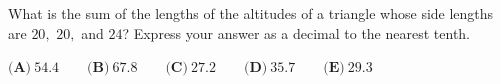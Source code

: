 What is the sum of the lengths of the altitudes of a triangle whose side lengths are $20,$ $20,$ and $24$? Express your answer as a decimal to the nearest tenth.

$\textbf{(A)}~54.4\qquad\textbf{(B)}~67.8\qquad\textbf{(C)}~27.2\qquad\textbf{(D)}~35.7\qquad\textbf{(E)}~29.3\qquad$
